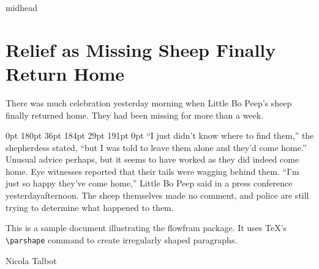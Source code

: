 \documentclass{article}
\begin{document}
\begin{staticcontents*}{midhead}
\section{Relief as Missing Sheep Finally Return Home}
\end{staticcontents*}

\framebreak
There was much celebration yesterday morning when Little Bo
Peep's sheep finally returned home. They had been missing
for more than a week.

{ 0pt \linewidth 0pt \linewidth 0pt \linewidth
0pt \linewidth 40pt 180pt 36pt 184pt 29pt 191pt
0pt \linewidth
``I just didn't know where to find them,'' the shepherdess
stated, ``but I was told to leave them alone and they'd come
home.'' Unusual advice perhaps, but it seems to have worked
as they did indeed come home. Eye witnesses reported that their
tails were wagging behind them.
``I'm just so happy they've come home,'' Little Bo Peep said
in a press conference yesterday\framebreak}afternoon.
The sheep themselves made no comment, and police are still
trying to determine what happened to them.

\noindent\hrulefill

This is a sample document illustrating the
flowfram package. It uses \TeX's \verb|\parshape| command
to create irregularly shaped paragraphs.

\hfill Nicola Talbot
\framebreak
\end{document}
